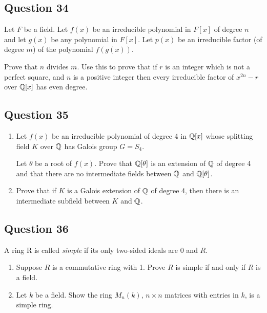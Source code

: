 \documentclass[12pt]{article}
\begin{document}
\hypertarget{question-34}{%
\subsection{Question 34}\label{question-34}}

Let \(F\) be a field. Let \(f(x)\) be an irreducible polynomial in
\(F[x]\) of degree \(n\) and let \(g(x)\) be any polynomial in \(F[x]\).
Let \(p(x)\) be an irreducible factor (of degree \(m\)) of the
polynomial \(f(g(x))\).

Prove that \(n\) divides \(m\). Use this to prove that if \(r\) is an
integer which is not a perfect square, and \(n\) is a positive integer
then every irreducible factor of \(x^{2n} - r\) over \({\mathbb{Q}}[x]\) has even
degree.

\hypertarget{question-35}{%
\subsection{Question 35}\label{question-35}}

\begin{enumerate}
\def\labelenumi{(\alph{enumi})}
\item
  Let \(f (x)\) be an irreducible polynomial of degree 4 in \({\mathbb{Q}}[x]\)
  whose splitting field \(K\) over \({\mathbb{Q}}\) has Galois group \(G = S_4\).

  Let \(\theta\) be a root of \(f(x)\). Prove that \({\mathbb{Q}}[\theta]\) is an
  extension of \({\mathbb{Q}}\) of degree 4 and that there are no intermediate
  fields between \({\mathbb{Q}}\) and \({\mathbb{Q}}[\theta]\).
\item
  Prove that if \(K\) is a Galois extension of \({\mathbb{Q}}\) of degree 4, then
  there is an intermediate subfield between \(K\) and \({\mathbb{Q}}\).
\end{enumerate}

\hypertarget{question-36}{%
\subsection{Question 36}\label{question-36}}

A ring R is called \emph{simple} if its only two-sided ideals are \(0\)
and \(R\).

\begin{enumerate}
\def\labelenumi{(\alph{enumi})}
\item
  Suppose \(R\) is a commutative ring with 1. Prove \(R\) is simple if
  and only if \(R\) is a field.
\item
  Let \(k\) be a field. Show the ring \(M_n (k)\), \(n \times n\)
  matrices with entries in \(k\), is a simple ring.
\end{enumerate}
\end{document}
